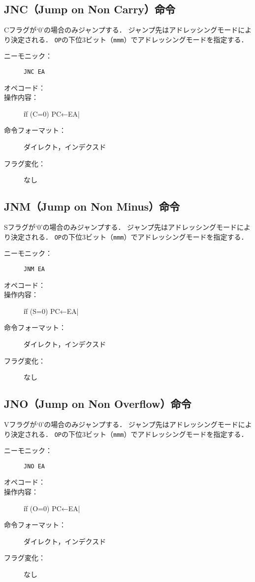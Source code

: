 \subsection{JNC（Jump on Non Carry）命令}
Cフラグが`0'の場合のみジャンプする．
ジャンプ先はアドレッシングモードにより決定される．
\texttt{OP}の下位3ビット（\texttt{mmm}）でアドレッシングモードを指定する．

\begin{description}
\item[ニーモニック：] \texttt{JNC EA}
\item[オペコード：] 
\item[操作内容：] \|if (C=0) PC←EA|
\item[命令フォーマット：] ダイレクト，インデクスド
\item[フラグ変化：] なし
\end{description}

\subsection{JNM（Jump on Non Minus）命令}
Sフラグが`0'の場合のみジャンプする．
ジャンプ先はアドレッシングモードにより決定される．
\texttt{OP}の下位3ビット（\texttt{mmm}）でアドレッシングモードを指定する．

\begin{description}
\item[ニーモニック：] \texttt{JNM EA}
\item[オペコード：] 
\item[操作内容：] \|if (S=0) PC←EA|
\item[命令フォーマット：] ダイレクト，インデクスド
\item[フラグ変化：] なし
\end{description}

\subsection{JNO（Jump on Non Overflow）命令}
Vフラグが`0'の場合のみジャンプする．
ジャンプ先はアドレッシングモードにより決定される．
\texttt{OP}の下位3ビット（\texttt{mmm}）でアドレッシングモードを指定する．

\begin{description}
\item[ニーモニック：] \texttt{JNO EA}
\item[オペコード：] 
\item[操作内容：] \|if (O=0) PC←EA|
\item[命令フォーマット：] ダイレクト，インデクスド
\item[フラグ変化：] なし
\end{description}

